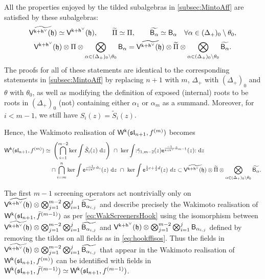 \documentclass[10pt,a4paper]{amsart}
\numberwithin{equation}{section}
\renewcommand{\cong}{\simeq} %
\newcommand{\dd}{\mathrm{d}}   %
\newcommand{\ee}{\mathsf{e}}   %
\newcommand{\kk}{\mathsf{k}}   %
\DeclarePairedDelimiter{\brac}{\lparen}{\rparen}   %
\newcommand{\no}[1]{\mathopen{:} #1 \mathclose{:}} %
\newcommand{\alg}[1]{\mathfrak{#1}}  %
\newcommand{\VOA}[1]{\mathsf{#1}}    %
\newcommand{\SLA}[2]{\alg{#1}_{#2}}                      %
\newcommand{\slnpone}{\SLA{sl}{n+1}}
\newcommand{\cartan}{\mathfrak{h}}
\newcommand{\cox}{\mathsf{h}}                                        %
\newcommand{\dcox}{\coroot{\cox}}                                    %
\newcommand{\proots}{\Delta_+}                                       %
\newcommand{\sroot}[1]{\alpha_{#1}}                                  %
\newcommand{\tsroot}[1]{\tilde{\alpha}_{#1}}                         %
\newcommand{\hroot}{\theta}                                          %
\newcommand{\coroot}[1]{#1^{\vee}}                                   %
\newcommand{\fhook}[1]{f^{(#1)}}                                  %
\newcommand{\Wsymb}{\VOA{W}}
\newcommand{\uaffvoa}[2]{\VOA{V}^{#1}\brac{#2}}                   %
\newcommand{\bgvoa}{\VOA{B}}                                      %
\newcommand{\uQHR}[3]{\Wsymb^{#1}\brac{#2,#3}}                    %
\theoremstyle{plain}
\begin{document}
All the properties enjoyed by the tilded subalgebras in \cref{subsec:MintoAff} are satisfied by these subalgebras:
%
\begin{equation} \label{eq:hookffisos}
\begin{gathered}
    \widetilde{\uaffvoa{\kk+\dcox}{\cartan}} \cong \uaffvoa{\kk+\dcox}{\cartan}, \qquad \widetilde{\Pi} \cong \Pi, \qquad \widetilde{\bgvoa_\alpha} \cong \bgvoa_\alpha \quad \forall \alpha \in (\proots)_0 \setminus \hroot_0,\\
    \uaffvoa{\kk+\dcox}{\cartan} \otimes \Pi \otimes \bigotimes_{\alpha \in (\proots)_0 \setminus \hroot_0} \bgvoa_\alpha= \widetilde{\uaffvoa{\kk+\dcox}{\cartan}} \otimes \widetilde{\Pi} \otimes \bigotimes_{\alpha \in (\proots)_0 \setminus \hroot_0} \widetilde{\bgvoa_\alpha}.
\end{gathered}
\end{equation}
%
The proofs for all of these statements are identical to the corresponding statements in \cref{subsec:MintoAff} by replacing $n+1$ with $m$, $\proots$ with $(\proots)_0$ and $\hroot$ with $\hroot_0$, as well as modifying the definition of exposed (internal) roots to be  roots in $(\proots)_0$ (not) containing either $\sroot{1}$ or $\sroot{m}$ as a summand. Moreover, for $i<m-1$, we still have $S_i(z) = \tilde{S}_i(z)$. 

Hence, the Wakimoto realisation of $\uQHR{\kk}{\slnpone}{\fhook{m}}$ becomes 
%
\begin{align}
     \uQHR{\kk}{\slnpone}{\fhook{m}} \cong&\ \left( \bigcap_{i=1}^{m-2} \textup{ker} \int \tilde{S}_i(z) \ \dd z \right)\ \cap \ \textup{ker} \int \no{\tilde{\gamma}_{1,m-2}(z) \ee^{\frac{-1}{\kk+\dcox} \tsroot{m-1}}(z)} \ \dd z\ \\
     &\cap \bigcap_{i=m}^{n} \textup{ker} \int \ee^{\frac{-1}{\kk+\dcox} \tilde{\alpha}_{i}}(z) \ \dd z\ \cap\  \textup{ker} \int \ee^{\frac{1}{2}c + \frac{1}{2}d}(z) \ dz \subset \widetilde{\uaffvoa{\kk+\dcox}{\cartan}} \otimes \widetilde{\Pi} \otimes \bigotimes_{\alpha \in (\proots)_0 \setminus \hroot_0} \widetilde{\bgvoa_\alpha}. \notag
\end{align}

The first $m-1$ screening operators act nontrivially only on $\widetilde{\uaffvoa{\kk+\dcox}{\cartan}} \otimes\bigotimes_{j=1}^{m-2}\bigotimes_{i=1}^{j} \widetilde{\bgvoa_{\sroot{i,j}}}$ and describe precisely the Wakimoto realisation of $\uQHR{\kk}{\slnpone}{\bar{f}^{(m-1)}}$ as per \eqref{eq:WakScreenersHook} using the isomorphism between $\widetilde{\uaffvoa{\kk+\dcox}{\cartan}} \otimes \bigotimes_{j=1}^{m-2}\bigotimes_{i=1}^{j} \widetilde{\bgvoa_{\sroot{i,j}}}$ and $\uaffvoa{\kk+\dcox}{\cartan} \otimes \bigotimes_{j=1}^{m-2}\bigotimes_{i=1}^{j} \bgvoa_{\sroot{i,j}}$ defined by removing the tildes on all fields as in \eqref{eq:hookffisos}. Thus the fields in $\widetilde{\uaffvoa{\kk+\dcox}{\cartan}} \otimes \bigotimes_{j=1}^{m-2}\bigotimes_{i=1}^{j} \widetilde{\bgvoa_{\sroot{i,j}}}$ that appear in the Wakimoto realisation of $\uQHR{\kk}{\slnpone}{\fhook{m}}$ can be identified with fields in $\uQHR{\kk}{\slnpone}{\bar{f}^{(m-1)}} \cong \uQHR{\kk}{\slnpone}{\fhook{m-1}}$. 
\end{document}

